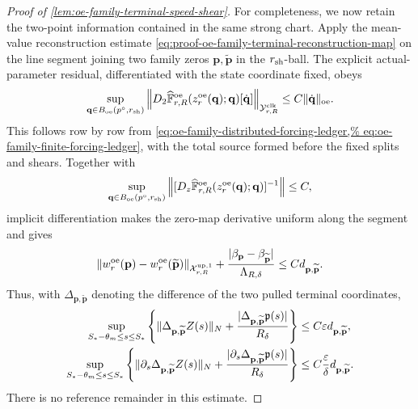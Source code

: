 \begin{proof}[Proof of
\cref{lem:oe-family-terminal-speed-shear}]
For completeness, we now retain the two-point information contained in
the same strong chart.  Apply the mean-value reconstruction estimate
\cref{eq:proof-oe-family-terminal-reconstruction-map} on the line
segment joining two family zeros
\(\mathbf p,\widetilde{\mathbf p}\) in the \(r_{\rm sh}\)-ball.
The explicit actual-parameter residual, differentiated with the state
coordinate fixed, obeys
\begin{equation}
 \sup_{\mathbf q\in B_{\rm oe}(p^\circ,r_{\rm sh})}
 \left\|D_2\widehat{\mathbb F}_{r,R}^{\rm oe}
   (z_r^{\rm oe}(\mathbf q);\mathbf q)
       [\dot{\mathbf q}]\right\|_
       {\mathcal Y_{r,R}^{\rm clk}}
 \le C\|\dot{\mathbf q}\|_{\rm oe}.             \label{eq:proof-oe-family-terminal-partial-external-jet}
\end{equation}
This follows row by row from
\cref{eq:oe-family-distributed-forcing-ledger,%
eq:oe-family-finite-forcing-ledger}, with the total source formed before
the fixed splits and shears.  Together with
\[
 \sup_{\mathbf q\in B_{\rm oe}(p^\circ,r_{\rm sh})}
 \left\|[D_z\widehat{\mathbb F}_{r,R}^{\rm oe}
   (z_r^{\rm oe}(\mathbf q);\mathbf q)]^{-1}\right\|\le C,
\]
implicit differentiation makes the zero-map derivative uniform along
the segment and gives
\begin{equation}
 \|w_r^{\rm oe}(\mathbf p)
       -w_r^{\rm oe}(\widetilde{\mathbf p})\|_
       {\mathcal X_{r,R}^{\rm up,1}}
 +\frac{|\beta_{\mathbf p}
       -\beta_{\widetilde{\mathbf p}}|}
       {\Lambda_{R,\delta}}
 \le C d_{\mathbf p,\widetilde{\mathbf p}}.     \label{eq:proof-oe-family-zero-two-point}
\end{equation}
Thus, with
\(\Delta_{\mathbf p,\widetilde{\mathbf p}}\) denoting the difference of
the two pulled terminal coordinates,
\begin{align}
 \sup_{S_*-\theta_m\le s\le S_*}
 \left\{\|\Delta_{\mathbf p,\widetilde{\mathbf p}}Z(s)\|_N
 +\frac{|\Delta_{\mathbf p,\widetilde{\mathbf p}}
              \mathfrak p(s)|}{R_\delta}\right\}
 &\le C\varepsilon
       d_{\mathbf p,\widetilde{\mathbf p}},\notag\\
 \sup_{S_*-\theta_m\le s\le S_*}
 \left\{\|\partial_s
          \Delta_{\mathbf p,\widetilde{\mathbf p}}Z(s)\|_N
 +\frac{|\partial_s
          \Delta_{\mathbf p,\widetilde{\mathbf p}}
              \mathfrak p(s)|}{R_\delta}\right\}
 &\le C\frac{\varepsilon}{\delta}
       d_{\mathbf p,\widetilde{\mathbf p}}.     \label{eq:proof-oe-family-terminal-two-point-reconstruction}
\end{align}
There is no reference remainder in this estimate.


\end{proof}
